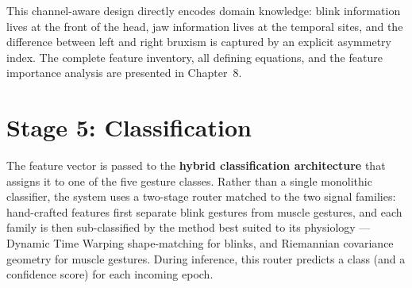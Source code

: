 This channel-aware design directly encodes domain knowledge: blink
information lives at the front of the head, jaw information lives at
the temporal sites, and the difference between left and right
bruxism is captured by an explicit asymmetry index. The complete
feature inventory, all defining equations, and the feature
importance analysis are presented in Chapter~8.

\section{Stage 5: Classification}
\label{sec:mo_classification}

The feature vector is passed to the \textbf{hybrid classification
architecture} that assigns it to one of the five gesture classes.
Rather than a single monolithic classifier, the system uses a
two-stage router matched to the two signal families: hand-crafted
features first separate blink gestures from muscle gestures, and each
family is then sub-classified by the method best suited to its
physiology --- Dynamic Time Warping shape-matching for blinks, and
Riemannian covariance geometry for muscle gestures. During inference,
this router predicts a class (and a confidence score) for each
incoming epoch.

